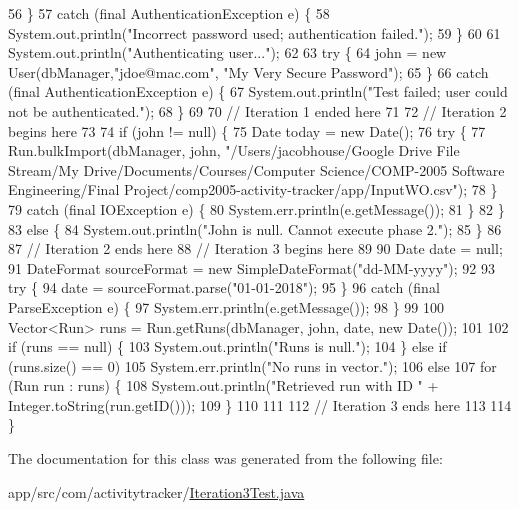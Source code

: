 \begin{DoxyCode}
56         \}
57         \textcolor{keywordflow}{catch} (\textcolor{keyword}{final} AuthenticationException e) \{
58             System.out.println(\textcolor{stringliteral}{"Incorrect password used; authentication failed."});
59         \}
60 
61         System.out.println(\textcolor{stringliteral}{"Authenticating user..."});
62 
63         \textcolor{keywordflow}{try} \{
64             john = \textcolor{keyword}{new} User(dbManager,\textcolor{stringliteral}{"jdoe@mac.com"}, \textcolor{stringliteral}{"My Very Secure Password"});
65         \}
66         \textcolor{keywordflow}{catch} (\textcolor{keyword}{final} AuthenticationException e) \{
67             System.out.println(\textcolor{stringliteral}{"Test failed; user could not be authenticated."});
68         \}
69 
70         \textcolor{comment}{// Iteration 1 ended here}
71 
72         \textcolor{comment}{// Iteration 2 begins here}
73 
74         \textcolor{keywordflow}{if} (john !=  null) \{
75             Date today = \textcolor{keyword}{new} Date();
76             \textcolor{keywordflow}{try} \{
77                 Run.bulkImport(dbManager, john, \textcolor{stringliteral}{"/Users/jacobhouse/Google Drive File Stream/My
       Drive/Documents/Courses/Computer Science/COMP-2005 Software Engineering/Final
       Project/comp2005-activity-tracker/app/InputWO.csv"});
78             \}
79             \textcolor{keywordflow}{catch} (\textcolor{keyword}{final} IOException e) \{
80                 System.err.println(e.getMessage());
81             \}
82         \}
83         \textcolor{keywordflow}{else} \{
84             System.out.println(\textcolor{stringliteral}{"John is null. Cannot execute phase 2."});
85         \}
86 
87         \textcolor{comment}{// Iteration 2 ends here}
88         \textcolor{comment}{// Iteration 3 begins here}
89 
90         Date date = null;
91         DateFormat sourceFormat = \textcolor{keyword}{new} SimpleDateFormat(\textcolor{stringliteral}{"dd-MM-yyyy"});
92 
93         \textcolor{keywordflow}{try} \{
94             date = sourceFormat.parse(\textcolor{stringliteral}{"01-01-2018"});
95         \}
96         \textcolor{keywordflow}{catch} (\textcolor{keyword}{final} ParseException e) \{
97             System.err.println(e.getMessage());
98         \}
99 
100         Vector<Run> runs = Run.getRuns(dbManager, john, date, \textcolor{keyword}{new} Date());
101 
102         \textcolor{keywordflow}{if} (runs == null) \{
103             System.out.println(\textcolor{stringliteral}{"Runs is null."});
104         \} \textcolor{keywordflow}{else} \textcolor{keywordflow}{if} (runs.size() == 0)
105             System.err.println(\textcolor{stringliteral}{"No runs in vector."});
106         \textcolor{keywordflow}{else}
107             \textcolor{keywordflow}{for} (Run run : runs) \{
108                 System.out.println(\textcolor{stringliteral}{"Retrieved run with ID "} + Integer.toString(run.getID()));
109             \}
110 
111 
112         \textcolor{comment}{// Iteration 3 ends here}
113 
114     \}
\end{DoxyCode}


The documentation for this class was generated from the following file\+:\begin{DoxyCompactItemize}
\item 
app/src/com/activitytracker/\mbox{\hyperlink{_iteration3_test_8java}{Iteration3\+Test.\+java}}\end{DoxyCompactItemize}
